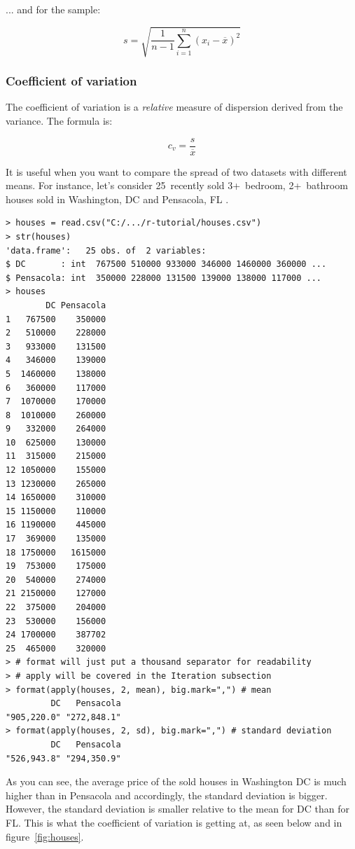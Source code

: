 \documentclass{report}
\begin{document}
			... and for the sample:
	
			\[
			s = \sqrt{\frac{1}{n-1}\sum_{i=1}^{n} (x_i - \overline{x})^2}
			\]
			
			\subsubsection{Coefficient of variation}
			
			The coefficient of variation is a \emph{relative} measure of dispersion derived from the variance. The formula is:
			
			\[
			c_v = \frac{s}{\overline{x}}
			\]
			
			It is useful when you want to compare the spread of two datasets with different means. For instance, let's consider 25~recently sold 3+~bedroom, 2+~bathroom houses sold in Washington, DC and Pensacola, FL \cite{houses_pfl, houses_wdc}.
			
			\begin{verbatim}
> houses = read.csv("C:/.../r-tutorial/houses.csv")
> str(houses)
'data.frame':   25 obs. of  2 variables:
$ DC       : int  767500 510000 933000 346000 1460000 360000 ...
$ Pensacola: int  350000 228000 131500 139000 138000 117000 ...
> houses
        DC Pensacola
1   767500    350000
2   510000    228000
3   933000    131500
4   346000    139000
5  1460000    138000
6   360000    117000
7  1070000    170000
8  1010000    260000
9   332000    264000
10  625000    130000
11  315000    215000
12 1050000    155000
13 1230000    265000
14 1650000    310000
15 1150000    110000
16 1190000    445000
17  369000    135000
18 1750000   1615000
19  753000    175000
20  540000    274000
21 2150000    127000
22  375000    204000
23  530000    156000
24 1700000    387702
25  465000    320000
> # format will just put a thousand separator for readability
> # apply will be covered in the Iteration subsection
> format(apply(houses, 2, mean), big.mark=",") # mean
         DC   Pensacola 
"905,220.0" "272,848.1" 
> format(apply(houses, 2, sd), big.mark=",") # standard deviation
         DC   Pensacola 
"526,943.8" "294,350.9" 
			\end{verbatim}
			
			As you can see, the average price of the sold houses in Washington DC is much higher than in Pensacola and accordingly, the standard deviation is bigger. However, the standard deviation is smaller relative to the mean for DC than for FL. This is what the coefficient of variation is getting at, as seen below and in figure~\ref{fig:houses}.
			
\end{document}
